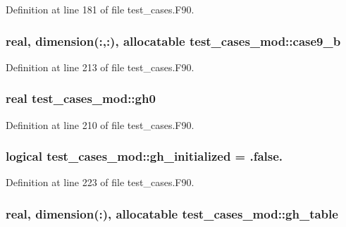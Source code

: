 Definition at line 181 of file test\-\_\-cases.\-F90.

\subsubsection[{case9\-\_\-b}]{\setlength{\rightskip}{0pt plus 5cm}real, dimension(\-:,\-:), allocatable test\-\_\-cases\-\_\-mod\-::case9\-\_\-b\hspace{0.3cm}{\ttfamily [private]}}\label{classtest__cases__mod_ad4fbc67ecd0c262bdc856412254fcd12}


Definition at line 213 of file test\-\_\-cases.\-F90.

\subsubsection[{gh0}]{\setlength{\rightskip}{0pt plus 5cm}real test\-\_\-cases\-\_\-mod\-::gh0\hspace{0.3cm}{\ttfamily [private]}}\label{classtest__cases__mod_a0330d24892de013b82c806b2eb174802}


Definition at line 210 of file test\-\_\-cases.\-F90.

\subsubsection[{gh\-\_\-initialized}]{\setlength{\rightskip}{0pt plus 5cm}logical test\-\_\-cases\-\_\-mod\-::gh\-\_\-initialized = .false.\hspace{0.3cm}{\ttfamily [private]}}\label{classtest__cases__mod_aacf71cede68445436888a520c4713a3c}


Definition at line 223 of file test\-\_\-cases.\-F90.

\subsubsection[{gh\-\_\-table}]{\setlength{\rightskip}{0pt plus 5cm}real, dimension(\-:), allocatable test\-\_\-cases\-\_\-mod\-::gh\-\_\-table\hspace{0.3cm}{\ttfamily [private]}}\label{classtest__cases__mod_a3e0198270bedfe3033ecef4e3d910c53}



